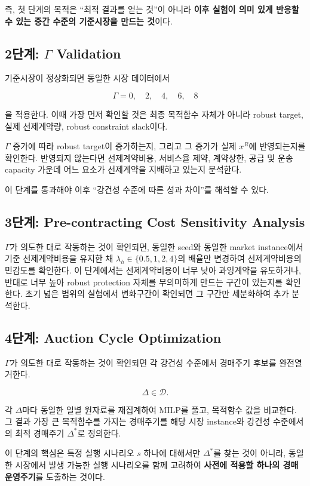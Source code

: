\documentclass[11pt,a4paper]{article}
\begin{document}
즉, 첫 단계의 목적은 ``최적 결과를 얻는 것''이 아니라
\textbf{이후 실험이 의미 있게 반응할 수 있는 중간 수준의 기준시장을 만드는 것}이다.

\subsection{2단계: $\Gamma$ Validation}

기준시장이 정상화되면 동일한 시장 데이터에서

\[
\Gamma=0,\quad 2,\quad 4,\quad 6,\quad 8
\]

을 적용한다.
이때 가장 먼저 확인할 것은 최종 목적함수 자체가 아니라
robust target, 실제 선제계약량, robust constraint slack이다.

$\Gamma$ 증가에 따라 robust target이 증가하는지,
그리고 그 증가가 실제 $x^R$에 반영되는지를 확인한다.
반영되지 않는다면 선제계약비용, 서비스율 제약, 계약상한,
공급 및 운송 capacity 가운데 어느 요소가 선제계약을 지배하고 있는지 분석한다.

이 단계를 통과해야 이후 ``강건성 수준에 따른 성과 차이''를 해석할 수 있다.

\subsection{3단계: Pre-contracting Cost Sensitivity Analysis}

$\Gamma$가 의도한 대로 작동하는 것이 확인되면,
동일한 seed와 동일한 market instance에서 기준 선제계약비용을 유지한 채
$\lambda_h\in\{0.5,1,2,4\}$의 배율만 변경하여 선제계약비용의 민감도를 확인한다.
이 단계에서는 선제계약비용이 너무 낮아 과잉계약을 유도하거나,
반대로 너무 높아 robust protection 자체를 무의미하게 만드는 구간이 있는지를 확인한다.
초기 넓은 범위의 실험에서 변화구간이 확인되면 그 구간만 세분화하여 추가 분석한다.

\subsection{4단계: Auction Cycle Optimization}

$\Gamma$가 의도한 대로 작동하는 것이 확인되면
각 강건성 수준에서 경매주기 후보를 완전열거한다.

\[
\Delta\in\mathcal D.
\]

각 $\Delta$마다 동일한 일별 원자료를 재집계하여 MILP를 풀고,
목적함수 값을 비교한다.
그 결과 가장 큰 목적함수를 가지는 경매주기를
해당 시장 instance와 강건성 수준에서의 최적 경매주기 $\Delta^*$로 정의한다.

이 단계의 핵심은 특정 실행 시나리오 $s$ 하나에 대해서만 $\Delta^*$를 찾는 것이 아니라,
동일한 시장에서 발생 가능한 실행 시나리오를 함께 고려하여
\textbf{사전에 적용할 하나의 경매 운영주기}를 도출하는 것이다.
\end{document}
